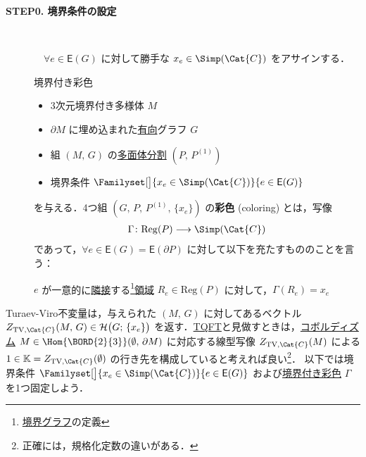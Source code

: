\documentclass[TQFT_main]{subfiles}
\begin{document}
\begin{description}
    \item[\textbf{STEP0. 境界条件の設定}]　
    
    　$\forall e \in \mathsf{E}(G)$ に対して勝手な $x_e \in \Simp(\Cat{C})$ をアサインする．

    \begin{mydef}[label=def:coloring-bdy]{境界付き彩色}
        \begin{itemize}
            \item 3次元境界付き多様体 $M$
            \item $\partial M$ に埋め込まれた\underline{有向}グラフ $G$
            \item 組 $(M,\, G)$ の\hyperref[def:polytope-decomp]{多面体分割} $(P,\, P^{(1)})$ 
            \item 境界条件 $\Familyset[\big]{x_e \in \Simp(\Cat{C})}{e \in \mathsf{E}(G)}$
        \end{itemize}
        を与える．4つ組 $(G,\, P,\, P^{(1)},\, \{x_e\})$ の\textbf{彩色} (coloring) とは，写像
        \begin{align}
            \Gamma \colon \mathrm{Reg} (P) \lto \Simp(\Cat{C})
        \end{align}
        であって，$\forall e \in \mathsf{E}(G) = \mathsf{E}(\partial P)$ に対して以下を充たすもののことを言う：

        $e$ が一意的に\hyperref[def:polyhedron]{隣接}する\footnote{\hyperref[def:graph-bdy]{境界グラフ}の定義}\hyperref[def:polyhedron]{領域} $R_e \in \mathrm{Reg}(P)$ に対して，$\Gamma(R_e) = x_e$
    \end{mydef}
\end{description}

Turaev-Viro不変量は，与えられた $(M,\, G)$ に対してあるベクトル $Z_{\text{TV},\Cat{C}} (M,\, G) \in \mathcal{H}\bigl(G;\, \{x_e\}\bigr)$ を返す．\hyperref[def:TQFT]{TQFT}と見做すときは，\hyperref[ex:Bord]{コボルディズム} $M \in \Hom{\BORD{2}{3}} (\emptyset,\, \partial M)$ に対応する線型写像 $Z_{\text{TV},\Cat{C}} (M)$ による $1 \in \mathbb{K} = Z_{\text{TV},\Cat{C}} (\emptyset)$ の行き先を構成していると考えれば良い\footnote{正確には，規格化定数の違いがある．}．
以下では境界条件 $\Familyset[\big]{x_e \in \Simp(\Cat{C})}{e \in \mathsf{E}(G)}$ および\hyperref[def:coloring-bdy]{境界付き彩色} $\Gamma$ を1つ固定しよう．
\end{document}
